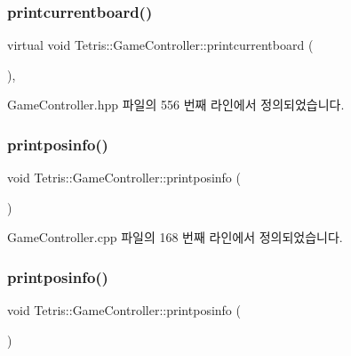 \subsubsection{\texorpdfstring{printcurrentboard()}{printcurrentboard()}\hspace{0.1cm}{\footnotesize\ttfamily [2/2]}}
{\footnotesize\ttfamily virtual void Tetris\+::\+Game\+Controller\+::printcurrentboard (\begin{DoxyParamCaption}{ }\end{DoxyParamCaption})\hspace{0.3cm}{\ttfamily [inline]}, {\ttfamily [virtual]}}



Game\+Controller.\+hpp 파일의 556 번째 라인에서 정의되었습니다.

\mbox{\label{class_tetris_1_1_game_controller_a269da7d33475ae2f327ee9a51f02ef52}} 
\subsubsection{\texorpdfstring{printposinfo()}{printposinfo()}\hspace{0.1cm}{\footnotesize\ttfamily [1/2]}}
{\footnotesize\ttfamily void Tetris\+::\+Game\+Controller\+::printposinfo (\begin{DoxyParamCaption}{ }\end{DoxyParamCaption})}



Game\+Controller.\+cpp 파일의 168 번째 라인에서 정의되었습니다.

\mbox{\label{class_tetris_1_1_game_controller_a269da7d33475ae2f327ee9a51f02ef52}} 
\subsubsection{\texorpdfstring{printposinfo()}{printposinfo()}\hspace{0.1cm}{\footnotesize\ttfamily [2/2]}}
{\footnotesize\ttfamily void Tetris\+::\+Game\+Controller\+::printposinfo (\begin{DoxyParamCaption}{ }\end{DoxyParamCaption})\hspace{0.3cm}{\ttfamily [inline]}}



